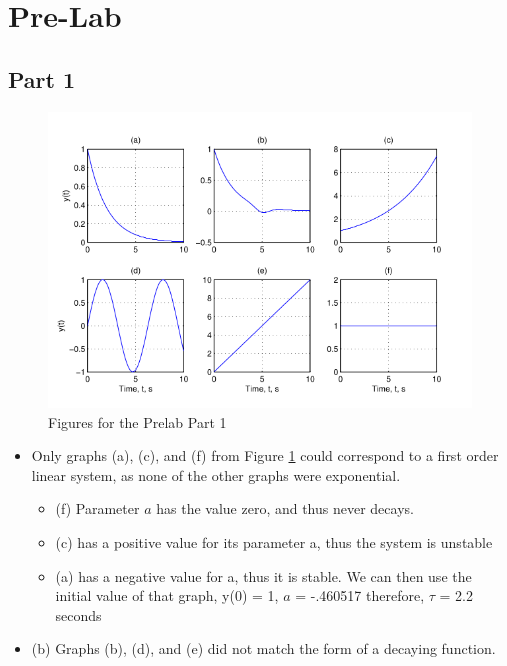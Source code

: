 \documentclass[12pt]{article}
\begin{document}
	
	\section{Pre-Lab}
		\subsection{Part 1}
			\begin{figure}[H]
			\centering
			\includegraphics[width=1\linewidth]{"Code/Fig/prelab_part1.png"}
			\caption{Figures for the Prelab Part 1}
			\label{fig:prelab}
		\end{figure}
		\begin{itemize}
			\item Only graphs (a), (c), and (f) from Figure \ref{fig:prelab} could correspond to a first order linear system, as none of the other graphs were exponential.
			\begin{itemize}
				\item (f) Parameter $a$ has the value zero, and thus never decays.
				\item (c)  has a positive value for its parameter a, thus the system is unstable
				\item (a)  has a negative value for a, thus it is stable. We can then use the initial value of that graph,
				y(0) = 1, $a$ = -.460517 therefore, $\tau$ = 2.2 seconds
			\end{itemize}
			\item (b) Graphs (b), (d), and (e) did not match the form of a decaying function.
		\end{itemize}
		
\end{document}
